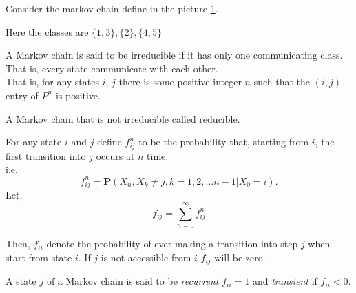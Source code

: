 \begin{example}[]
    Consider the markov chain define in the picture \cref{example of communication}.
\begin{figure}[h]
    \centering
    \caption{}
    \label{example of communication}
\end{figure}

Here the classes are $\{ 1,3 \}, \{2\}, \{4,5\}$
\end{example}

\begin{definition}
    A Markov chain is said to be irreducible if it has only one communicating class. That is, every state communicate with each other.\\ 
    That is, for any states $i$, $j$ there is some positive integer $n$ such that the $(i, j)$ entry of $ P^{n} $ is positive.
\end{definition}

A Markov chain that is not irreducible called reducible.

For any state $ i $ and $ j $ define $ f^{n}_{ij} $ to be the probability that, starting from $ i $, the first transition into $ j  $
occurs at $ n $ time. \\ 
i.e. 
\[
    f^{n}_{ij} = \mathbf{P}(X_{n},X_{k}\neq j, k=1,2,\ldots n-1|X_{0}=i).
\]
Let,
\[
    f_{ij}=\sum_{n=0}^{\infty} f^{n}_{ij}
\]

Then, $ f_{ii} $ denote the probability of ever making a transition into step $ j $ when start from state $ i $. 
If $ j $ is not accessible from $ i $ $ f_{ij} $ will be zero.

\begin{definition}
    A state $ j $ of a Markov chain is said to be \textit{recurrent}  $ f_{ii}=1 $ and \textit{transient}  if $ f_{ii}<0 $.
\end{definition}

